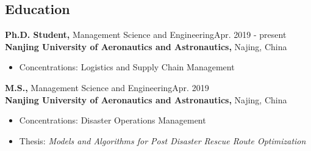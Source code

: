 \documentclass[margin]{res}
\begin{document}
 

\address{
Nanjing University of Aeronautics and Astronautics \\
29 Jiangjun Avenue, Nanjing \\
Jiangsu, China 211106}
\address{
Email: guopenghui@outlook.com \\
Homepage: https://guo.ph}

\begin{resume} 




\section{\sc Education}
{\bf Ph.D. Student,}  Management Science and Engineering\hfill Apr. 2019 - present \\
{\bf Nanjing University of Aeronautics and Astronautics,} Najing, China
\begin{itemize}  \itemsep -2pt  %
\item Concentrations: Logistics and Supply Chain Management
\end{itemize}

{\bf M.S.,}  Management Science and Engineering\hfill Apr. 2019 \\
{\bf Nanjing University of Aeronautics and Astronautics,} Najing, China
\begin{itemize}  \itemsep -2pt  %
\item Concentrations: Disaster Operations Management
\item Thesis: {\it Models and Algorithms for Post Disaster Rescue Route Optimization}
\end{itemize}


\end{resume}
\end{document}
